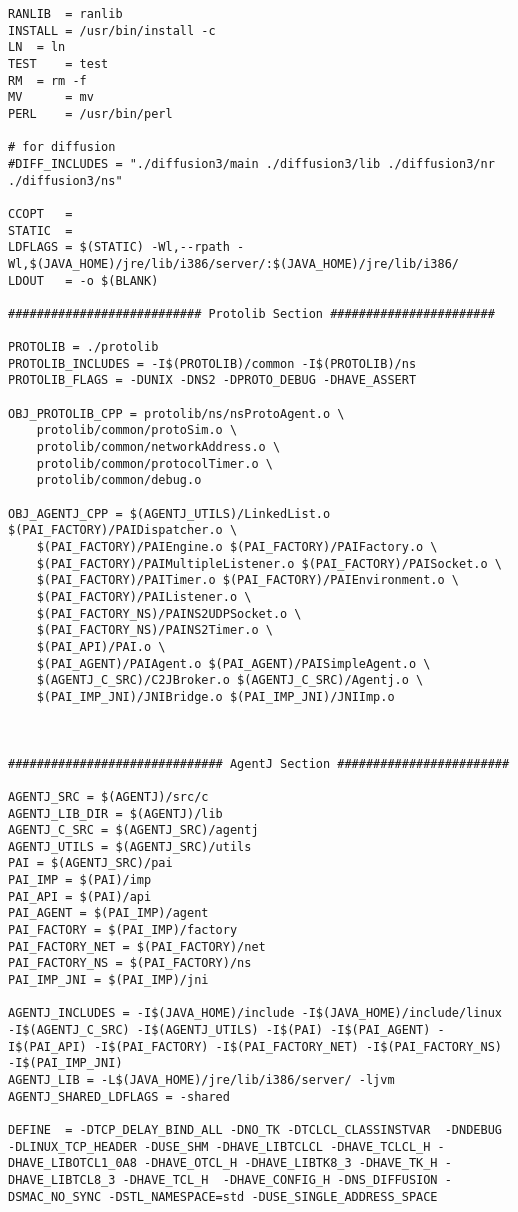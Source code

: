 \begin{verbatim}
RANLIB	= ranlib
INSTALL	= /usr/bin/install -c
LN	= ln
TEST	= test
RM	= rm -f
MV      = mv
PERL	= /usr/bin/perl

# for diffusion
#DIFF_INCLUDES = "./diffusion3/main ./diffusion3/lib ./diffusion3/nr ./diffusion3/ns"

CCOPT	= 
STATIC	= 
LDFLAGS	= $(STATIC) -Wl,--rpath -Wl,$(JAVA_HOME)/jre/lib/i386/server/:$(JAVA_HOME)/jre/lib/i386/
LDOUT	= -o $(BLANK)

########################### Protolib Section #######################

PROTOLIB = ./protolib
PROTOLIB_INCLUDES = -I$(PROTOLIB)/common -I$(PROTOLIB)/ns
PROTOLIB_FLAGS = -DUNIX -DNS2 -DPROTO_DEBUG -DHAVE_ASSERT 

OBJ_PROTOLIB_CPP = protolib/ns/nsProtoAgent.o \
	protolib/common/protoSim.o \
	protolib/common/networkAddress.o \
	protolib/common/protocolTimer.o \
	protolib/common/debug.o

OBJ_AGENTJ_CPP = $(AGENTJ_UTILS)/LinkedList.o $(PAI_FACTORY)/PAIDispatcher.o \
	$(PAI_FACTORY)/PAIEngine.o $(PAI_FACTORY)/PAIFactory.o \
	$(PAI_FACTORY)/PAIMultipleListener.o $(PAI_FACTORY)/PAISocket.o \
	$(PAI_FACTORY)/PAITimer.o $(PAI_FACTORY)/PAIEnvironment.o \
	$(PAI_FACTORY)/PAIListener.o \
	$(PAI_FACTORY_NS)/PAINS2UDPSocket.o \
	$(PAI_FACTORY_NS)/PAINS2Timer.o \
	$(PAI_API)/PAI.o \
	$(PAI_AGENT)/PAIAgent.o $(PAI_AGENT)/PAISimpleAgent.o \
	$(AGENTJ_C_SRC)/C2JBroker.o $(AGENTJ_C_SRC)/Agentj.o \
	$(PAI_IMP_JNI)/JNIBridge.o $(PAI_IMP_JNI)/JNIImp.o



############################## AgentJ Section ########################

AGENTJ_SRC = $(AGENTJ)/src/c
AGENTJ_LIB_DIR = $(AGENTJ)/lib
AGENTJ_C_SRC = $(AGENTJ_SRC)/agentj
AGENTJ_UTILS = $(AGENTJ_SRC)/utils
PAI = $(AGENTJ_SRC)/pai
PAI_IMP = $(PAI)/imp
PAI_API = $(PAI)/api
PAI_AGENT = $(PAI_IMP)/agent
PAI_FACTORY = $(PAI_IMP)/factory
PAI_FACTORY_NET = $(PAI_FACTORY)/net
PAI_FACTORY_NS = $(PAI_FACTORY)/ns
PAI_IMP_JNI = $(PAI_IMP)/jni

AGENTJ_INCLUDES = -I$(JAVA_HOME)/include -I$(JAVA_HOME)/include/linux -I$(AGENTJ_C_SRC) -I$(AGENTJ_UTILS) -I$(PAI) -I$(PAI_AGENT) -I$(PAI_API) -I$(PAI_FACTORY) -I$(PAI_FACTORY_NET) -I$(PAI_FACTORY_NS) -I$(PAI_IMP_JNI) 
AGENTJ_LIB = -L$(JAVA_HOME)/jre/lib/i386/server/ -ljvm
AGENTJ_SHARED_LDFLAGS = -shared

DEFINE	= -DTCP_DELAY_BIND_ALL -DNO_TK -DTCLCL_CLASSINSTVAR  -DNDEBUG -DLINUX_TCP_HEADER -DUSE_SHM -DHAVE_LIBTCLCL -DHAVE_TCLCL_H -DHAVE_LIBOTCL1_0A8 -DHAVE_OTCL_H -DHAVE_LIBTK8_3 -DHAVE_TK_H -DHAVE_LIBTCL8_3 -DHAVE_TCL_H  -DHAVE_CONFIG_H -DNS_DIFFUSION -DSMAC_NO_SYNC -DSTL_NAMESPACE=std -DUSE_SINGLE_ADDRESS_SPACE


\end{verbatim}
